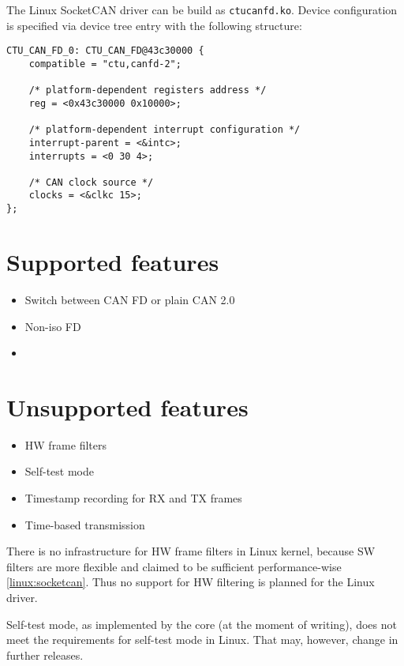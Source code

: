 
The Linux SocketCAN driver can be build as \verb|ctucanfd.ko|.
Device configuration is specified via device tree entry with the following
structure:

\begin{verbatim}
CTU_CAN_FD_0: CTU_CAN_FD@43c30000 {
    compatible = "ctu,canfd-2";

    /* platform-dependent registers address */
    reg = <0x43c30000 0x10000>;

    /* platform-dependent interrupt configuration */
    interrupt-parent = <&intc>;
    interrupts = <0 30 4>;

    /* CAN clock source */
    clocks = <&clkc 15>;
};
\end{verbatim}

\section{Supported features}

\begin{itemize}
\item Switch between CAN FD or plain CAN 2.0
\item Non-iso FD
\item
\end{itemize}

\section{Unsupported features}

\begin{itemize}
\item HW frame filters
\item Self-test mode
\item Timestamp recording for RX and TX frames
\item Time-based transmission
\end{itemize}

There is no infrastructure for HW frame filters in Linux kernel, because SW filters
are more flexible and claimed to be sufficient performance-wise \ref{linux:socketcan}.
Thus no support for HW filtering is planned for the Linux driver.

Self-test mode, as implemented by the core (at the moment of writing), does not
meet the requirements for self-test mode in Linux. That may, however, change in
further releases.

